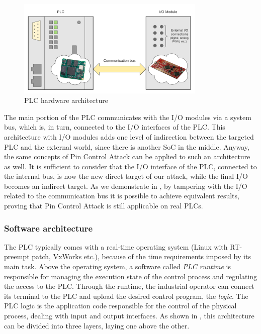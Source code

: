 \begin{figure}[h]
\centerline{\includegraphics[width=0.8\textwidth]{res/plc_arch}}
\caption{PLC hardware architecture \label{fig:plc_arch}}
\end{figure}

The main portion of the PLC communicates with the I/O modules via a system bus, which is, in turn, connected to the I/O interfaces of the PLC.
This architecture with I/O modules adds one level of indirection between the targeted PLC and the external world, since there is another SoC in the middle.
Anyway, the same concepts of Pin Control Attack can be applied to such an architecture as well. It is sufficient to consider that the I/O interface of the PLC,
connected to the internal bus, is now the new direct target of our attack, while the final I/O becomes an indirect target. As we demonstrate in ,
by tampering with the I/O related to the communication bus it is possible to achieve equivalent results, proving that Pin Control Attack is still applicable on real PLCs.


\subsubsection{Software architecture}

The PLC typically comes with a real-time operating system (\eg Linux with RT-preempt patch, VxWorks etc.), because of the time requirements imposed by its main task.
Above the operating system, a software called \emph{PLC runtime} is responsible for managing the execution state of the control process and regulating the access to the PLC.
Through the runtime, the industrial operator can connect its terminal to the PLC and upload the desired control program, the \emph{logic}.
The PLC logic is the application code responsible for the control of the physical process, dealing with input and output interfaces.
As shown in , this architecture can be divided into three layers, laying one above the other.

